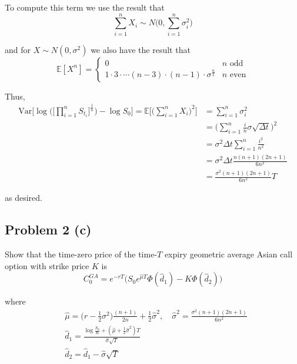 \documentclass[12pt]{article}
\newlength\tindent
\renewcommand{\indent}{\hspace*{\tindent}}
\begin{document}
To compute this term we use the result that
\begin{equation*}
	\sum^n_{i=1} X_i \sim N \bigg(0, \sum^n_{i=1}\sigma^2_i \bigg)
\end{equation*}

and for $X \sim N(0, \sigma^2)$ we also have the result that
\begin{equation*}
	\mathbb E[X^n] = \begin{cases}
		0 & n \text{ odd} \\
		1 \cdot 3 \cdot \cdots (n - 3) \cdot (n - 1) \cdot \sigma^{\frac{n}{2}} & n \text{ even}
	\end{cases}
\end{equation*}

Thus,
\begin{align*}
	\mathrm{Var} \Bigg[ \log \Bigg( \Bigg[ \prod^{n}_{i=1} S_{t_i} \Bigg]^{\frac{1}{n}} \Bigg) - \log S_0 \Bigg] = \mathbb E \bigg[ \bigg(\sum^n_{i=1} X_i \bigg)^2\bigg] &= \sum^n_{i=1}\sigma^2_i \\
	&= \bigg( \sum^n_{i=1} \frac{i}{n}\sigma\sqrt{\Delta t} \bigg)^2 \\
	&= \sigma^2 \Delta t \sum^n_{i=1} \frac{i^2}{n^2} \\
	&= \sigma^2 \Delta t \frac{n (n+1) (2n + 1)}{6n^2} \\
	&= \frac{\sigma^2 (n+1) (2n + 1)}{6n^2} T
\end{align*}

as desired. \\

\subsection{Problem 2 (c)} 

\indent Show that the time-zero price of the time-$T$ expiry geometric average Asian call option with strike price $K$ is
\begin{equation*}
	C^{GA}_0 = e^{-rT} \Big( S_0 e^{\hat{\mu}T}\Phi(\hat{d}_1) - K\Phi(\hat{d}_2) \Big)
\end{equation*}

where 
\begin{align*}
	&\hat{\mu} = \Big(r - \frac{1}{2}\sigma^2 \Big)\frac{(n + 1)}{2n} + \frac{1}{2}\hat{\sigma}^2, \quad \hat{\sigma}^2 = \frac{\sigma^2 (n + 1)(2n + 1)}{6n^2} \\
	&\hat{d}_1 = \frac{\log \frac{S_0}{K} + (\hat{\mu} + \frac{1}{2}\hat{\sigma}^2)T}{\hat{\sigma}\sqrt{T}} \\
	&\hat{d}_2 = \hat{d}_1 - \hat{\sigma}\sqrt{T}
\end{align*}
\end{document}
